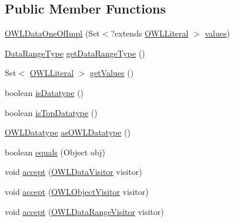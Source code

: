 \subsection*{Public Member Functions}
\begin{DoxyCompactItemize}
\item 
\hyperlink{classuk_1_1ac_1_1manchester_1_1cs_1_1owl_1_1owlapi_1_1_o_w_l_data_one_of_impl_a82feee2db034cf831b7ecb9d775cb5dc}{O\-W\-L\-Data\-One\-Of\-Impl} (Set$<$?extends \hyperlink{interfaceorg_1_1semanticweb_1_1owlapi_1_1model_1_1_o_w_l_literal}{O\-W\-L\-Literal} $>$ \hyperlink{classuk_1_1ac_1_1manchester_1_1cs_1_1owl_1_1owlapi_1_1_o_w_l_data_one_of_impl_aba953817f70e2a98b28ab82ead8ea5db}{values})
\item 
\hyperlink{enumorg_1_1semanticweb_1_1owlapi_1_1model_1_1_data_range_type}{Data\-Range\-Type} \hyperlink{classuk_1_1ac_1_1manchester_1_1cs_1_1owl_1_1owlapi_1_1_o_w_l_data_one_of_impl_a95ce01f5f8b4ad0aaa8c1ccae685a1d4}{get\-Data\-Range\-Type} ()
\item 
Set$<$ \hyperlink{interfaceorg_1_1semanticweb_1_1owlapi_1_1model_1_1_o_w_l_literal}{O\-W\-L\-Literal} $>$ \hyperlink{classuk_1_1ac_1_1manchester_1_1cs_1_1owl_1_1owlapi_1_1_o_w_l_data_one_of_impl_a78c6ab0e60f9311a8ede9d7d356f4a14}{get\-Values} ()
\item 
boolean \hyperlink{classuk_1_1ac_1_1manchester_1_1cs_1_1owl_1_1owlapi_1_1_o_w_l_data_one_of_impl_af240d7cda0739392083320760c4695fd}{is\-Datatype} ()
\item 
boolean \hyperlink{classuk_1_1ac_1_1manchester_1_1cs_1_1owl_1_1owlapi_1_1_o_w_l_data_one_of_impl_a541387f825b9bc8023c7ed607d1da62c}{is\-Top\-Datatype} ()
\item 
\hyperlink{interfaceorg_1_1semanticweb_1_1owlapi_1_1model_1_1_o_w_l_datatype}{O\-W\-L\-Datatype} \hyperlink{classuk_1_1ac_1_1manchester_1_1cs_1_1owl_1_1owlapi_1_1_o_w_l_data_one_of_impl_a7b7ba7326411fe0619a29d7e4db72dd1}{as\-O\-W\-L\-Datatype} ()
\item 
boolean \hyperlink{classuk_1_1ac_1_1manchester_1_1cs_1_1owl_1_1owlapi_1_1_o_w_l_data_one_of_impl_a45d27d6aef86556a3f7e6c17263dd72a}{equals} (Object obj)
\item 
void \hyperlink{classuk_1_1ac_1_1manchester_1_1cs_1_1owl_1_1owlapi_1_1_o_w_l_data_one_of_impl_a562922f5fae2f8995ca4482c2775c19a}{accept} (\hyperlink{interfaceorg_1_1semanticweb_1_1owlapi_1_1model_1_1_o_w_l_data_visitor}{O\-W\-L\-Data\-Visitor} visitor)
\item 
void \hyperlink{classuk_1_1ac_1_1manchester_1_1cs_1_1owl_1_1owlapi_1_1_o_w_l_data_one_of_impl_a873edf61cd88ac1be6ec2782f6a7a583}{accept} (\hyperlink{interfaceorg_1_1semanticweb_1_1owlapi_1_1model_1_1_o_w_l_object_visitor}{O\-W\-L\-Object\-Visitor} visitor)
\item 
void \hyperlink{classuk_1_1ac_1_1manchester_1_1cs_1_1owl_1_1owlapi_1_1_o_w_l_data_one_of_impl_a4d67e382974f440d1d86776c2d319757}{accept} (\hyperlink{interfaceorg_1_1semanticweb_1_1owlapi_1_1model_1_1_o_w_l_data_range_visitor}{O\-W\-L\-Data\-Range\-Visitor} visitor)
\end{DoxyCompactItemize}
